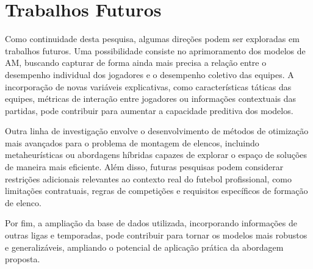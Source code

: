 \section{Trabalhos Futuros}

Como continuidade desta pesquisa, algumas direções podem ser exploradas em trabalhos futuros. Uma possibilidade consiste no aprimoramento dos modelos de AM, 
buscando capturar de forma ainda mais precisa a relação entre o desempenho individual dos jogadores e o desempenho coletivo das equipes. 
A incorporação de novas variáveis explicativas, como características táticas das equipes, métricas de interação entre jogadores ou informações contextuais das partidas, 
pode contribuir para aumentar a capacidade preditiva dos modelos.

Outra linha de investigação envolve o desenvolvimento de métodos de otimização mais avançados para o problema de montagem de elencos, incluindo 
metaheurísticas ou abordagens híbridas capazes de explorar o espaço de soluções de maneira mais eficiente. Além disso, futuras pesquisas podem considerar 
restrições adicionais relevantes ao contexto real do futebol profissional, como limitações contratuais, regras de competições e requisitos específicos de 
formação de elenco.

Por fim, a ampliação da base de dados utilizada, incorporando informações de outras ligas e temporadas, pode contribuir para tornar os modelos mais 
robustos e generalizáveis, ampliando o potencial de aplicação prática da abordagem proposta.




